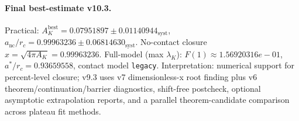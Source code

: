 \paragraph{Final best-estimate v10.3.}
Practical: $A_K^{\mathrm{best}} = 0.07951897 \pm 0.01140944_{\mathrm{syst}}$, $a_{\mathrm{nc}}/r_c = 0.99963236 \pm 0.06814630_{\mathrm{syst}}$.
No-contact closure $x = \sqrt{4\pi A_K} = 0.99963236$.
Full-model (max $\lambda_K$): $F(1) \approx 1.56920316e-01$, $a^*/r_c = 0.93659558$, contact model \texttt{legacy}.
Interpretation: numerical support for percent-level closure; v9.3 uses v7 dimensionless-x root finding plus v6 theorem/continuation/barrier diagnostics, shift-free postcheck, optional asymptotic extrapolation reports, and a parallel theorem-candidate comparison across plateau fit methods.
